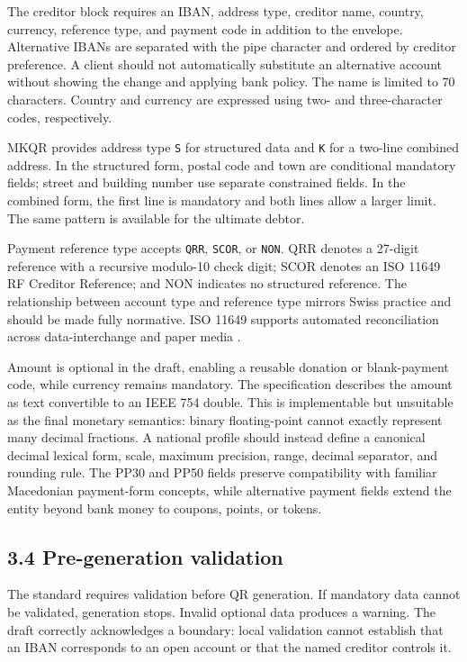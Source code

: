 The creditor block requires an IBAN, address type, creditor name, country, currency, reference type, and payment code in addition to the envelope. Alternative IBANs are separated with the pipe character and ordered by creditor preference. A client should not automatically substitute an alternative account without showing the change and applying bank policy. The name is limited to 70 characters. Country and currency are expressed using two- and three-character codes, respectively.

MKQR provides address type \texttt{S} for structured data and \texttt{K} for a two-line combined address. In the structured form, postal code and town are conditional mandatory fields; street and building number use separate constrained fields. In the combined form, the first line is mandatory and both lines allow a larger limit. The same pattern is available for the ultimate debtor.

Payment reference type accepts \texttt{QRR}, \texttt{SCOR}, or \texttt{NON}. QRR denotes a 27-digit reference with a recursive modulo-10 check digit; SCOR denotes an ISO 11649 RF Creditor Reference; and NON indicates no structured reference. The relationship between account type and reference type mirrors Swiss practice and should be made fully normative. ISO 11649 supports automated reconciliation across data-interchange and paper media \cite{iso11649}.

Amount is optional in the draft, enabling a reusable donation or blank-payment code, while currency remains mandatory. The specification describes the amount as text convertible to an IEEE 754 double. This is implementable but unsuitable as the final monetary semantics: binary floating-point cannot exactly represent many decimal fractions. A national profile should instead define a canonical decimal lexical form, scale, maximum precision, range, decimal separator, and rounding rule. The PP30 and PP50 fields preserve compatibility with familiar Macedonian payment-form concepts, while alternative payment fields extend the entity beyond bank money to coupons, points, or tokens.

\subsection{3.4 Pre-generation validation}

The standard requires validation before QR generation. If mandatory data cannot be validated, generation stops. Invalid optional data produces a warning. The draft correctly acknowledges a boundary: local validation cannot establish that an IBAN corresponds to an open account or that the named creditor controls it.

